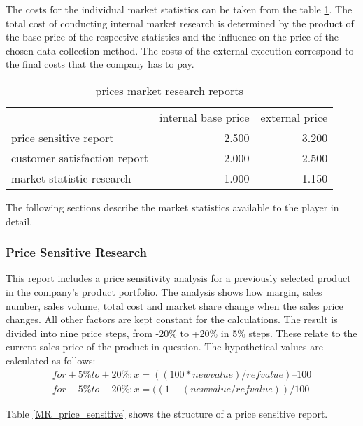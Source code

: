 The costs for the individual market statistics can be taken from the table \ref{MR_report_price}. The total cost of conducting internal market research is determined by the product of the base price of the respective statistics and the influence on the price of the chosen data collection method. The costs of the external execution correspond to the final costs that the company has to pay.

\begin{table}[ht]
\centering
\begin{tabular}{|l|r|r|}
\hline
                             & internal base price  & external price \\
price sensitive report       & 2.500                & 3.200     \\
customer satisfaction report & 2.000                & 2.500     \\
market statistic research    & 1.000                & 1.150     \\
\hline
\end{tabular}
\caption{prices market research reports}
\label{MR_report_price}
\end{table}

The following sections describe the market statistics available to the player in detail.

\subsubsection{Price Sensitive Research}
This report includes a price sensitivity analysis for a previously selected product in the company's product portfolio. The analysis shows how margin, sales number, sales volume, total cost and market share change when the sales price changes. All other factors are kept constant for the calculations. The result is divided into nine price steps, from -20\% to +20\% in 5\% steps. These relate to the current sales price of the product in question. The hypothetical values are calculated as follows:
\begin{equation}
    \begin{aligned}
        for +5\% to +20\%: x = ((100 * new value) / ref value) – 100 \\
        for -5\% to -20\%: x = ((1 - (new value / ref value)) / 100
    \end{aligned}
\end{equation}

Table \ref{MR_price_sensitive} shows the structure of a price sensitive report. 

